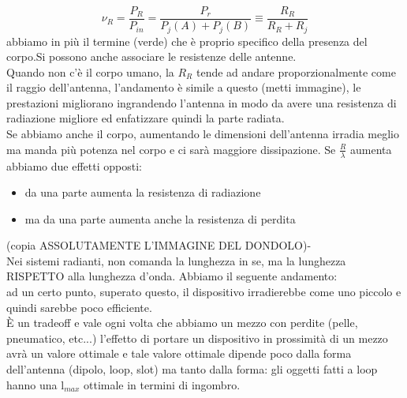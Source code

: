 \documentclass[oneside, 12pt]{extbook}
\begin{document}
\begin{itemize}
\begin{equation}
		\nu_R = \frac{P_R}{P_{in}} = \dfrac{P_r}{P_j(A) + P_j(B)} \equiv \dfrac{R_R}{R_R + R_j}
	\end{equation}
	abbiamo in più il termine (verde) che è proprio specifico della presenza del corpo.Si possono anche associare le resistenze delle antenne.\\Quando non c'è il corpo umano, la $R_R$ tende ad andare proporzionalmente come il raggio dell'antenna, l'andamento è simile a questo (metti immagine), le prestazioni migliorano ingrandendo l'antenna in modo da avere una resistenza di radiazione migliore ed enfatizzare quindi la parte radiata.\\Se abbiamo anche il corpo, aumentando le dimensioni dell'antenna irradia meglio ma manda più potenza nel corpo e ci sarà maggiore dissipazione. Se $\frac{R}{\lambda}$ aumenta abbiamo due effetti opposti:
	\begin{itemize}
		\item da una parte aumenta la resistenza di radiazione
		\item ma da una parte aumenta anche la resistenza di perdita
	\end{itemize}
	(copia ASSOLUTAMENTE L'IMMAGINE DEL DONDOLO)-\\Nei sistemi radianti, non comanda la lunghezza in se, ma la lunghezza RISPETTO alla lunghezza d'onda. Abbiamo il seguente andamento:\\ ad un certo punto, superato questo, il dispositivo irradierebbe come uno piccolo e quindi sarebbe poco efficiente.\\È un tradeoff e vale ogni volta che abbiamo un mezzo con perdite (pelle, pneumatico, etc...) l'effetto di portare un dispositivo in prossimità di un mezzo avrà un valore ottimale e tale valore ottimale dipende poco dalla forma dell'antenna (dipolo, loop, slot) ma tanto dalla forma: gli oggetti fatti a loop hanno una l$_{max}$ ottimale in termini di ingombro.

\end{itemize}
\end{document}
